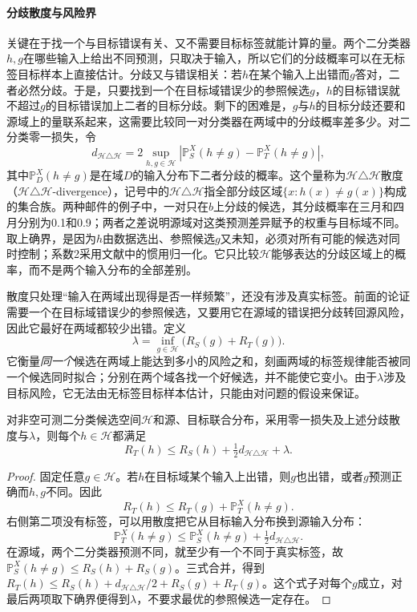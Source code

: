 \paragraph{分歧散度与风险界}
关键在于找一个与目标错误有关、又不需要目标标签就能计算的量。两个二分类器$h,g$在哪些输入上给出不同预测，只取决于输入，所以它们的分歧概率可以在无标签目标样本上直接估计。分歧又与错误相关：若$h$在某个输入上出错而$g$答对，二者必然分歧。于是，只要找到一个在目标域错误少的参照候选$g$，$h$的目标错误就不超过$g$的目标错误加上二者的目标分歧。剩下的困难是，$g$与$h$的目标分歧还要和源域上的量联系起来，这需要比较同一对分类器在两域中的分歧概率差多少。对二分类零一损失，令
\begin{equation}
 d_{\mathcal H\triangle\mathcal H}
 =2\sup_{h,g\in\mathcal H}
 \left|\mathbb P_S^X(h\neq g)-\mathbb P_T^X(h\neq g)\right| ,
 \label{eq:h-delta-h-divergence}
\end{equation}
其中$\mathbb P_D^X(h\neq g)$是在域$D$的输入分布下二者分歧的概率。这个量称为$\mathcal H\triangle\mathcal H$散度（$\mathcal H\triangle\mathcal H$-divergence），记号中的$\mathcal H\triangle\mathcal H$指全部分歧区域$\{x:h(x)\neq g(x)\}$构成的集合族。两种邮件的例子中，一对只在$b$上分歧的候选，其分歧概率在三月和四月分别为0.1和0.9；两者之差说明源域对这类预测差异赋予的权重与目标域不同。取上确界，是因为$h$由数据选出、参照候选$g$又未知，必须对所有可能的候选对同时控制；系数2采用文献中的惯用归一化。它只比较$\mathcal H$能够表达的分歧区域上的概率，而不是两个输入分布的全部差别。

散度只处理“输入在两域出现得是否一样频繁”，还没有涉及真实标签。前面的论证需要一个在目标域错误少的参照候选，又要用它在源域的错误把分歧转回源风险，因此它最好在两域都较少出错。定义
\[
 \lambda=\inf_{g\in\mathcal H}\bigl(R_S(g)+R_T(g)\bigr).
\]
它衡量\emph{同一个}候选在两域上能达到多小的风险之和，刻画两域的标签规律能否被同一个候选同时拟合；分别在两个域各找一个好候选，并不能使它变小。由于$\lambda$涉及目标风险，它无法由无标签目标样本估计，只能由对问题的假设来保证。

\begin{theorem}[领域自适应的目标域期望风险界]
\label{thm:domain-adaptation-bound}
对非空可测二分类候选空间$\mathcal H$和源、目标联合分布，采用零一损失及上述分歧散度与$\lambda$，则每个$h\in\mathcal H$都满足
\begin{equation}
 R_T(h)\leq R_S(h)+\tfrac12d_{\mathcal H\triangle\mathcal H}+\lambda.
 \label{eq:domain-adaptation-risk-bound}
\end{equation}
\end{theorem}
\begin{proof}
固定任意$g\in\mathcal H$。若$h$在目标域某个输入上出错，则$g$也出错，或者$g$预测正确而$h,g$不同。因此
\[
 R_T(h)\leq R_T(g)+\mathbb P_T^X(h\neq g).
\]
右侧第二项没有标签，可以用散度把它从目标输入分布换到源输入分布：
\[
 \mathbb P_T^X(h\neq g)
 \leq\mathbb P_S^X(h\neq g)+\tfrac12d_{\mathcal H\triangle\mathcal H}.
\]
在源域，两个二分类器预测不同，就至少有一个不同于真实标签，故$\mathbb P_S^X(h\neq g)\leq R_S(h)+R_S(g)$。三式合并，得到
$R_T(h)\leq R_S(h)+d_{\mathcal H\triangle\mathcal H}/2+R_S(g)+R_T(g)$。这个式子对每个$g$成立，对最后两项取下确界便得到$\lambda$，不要求最优的参照候选一定存在。
\end{proof}
